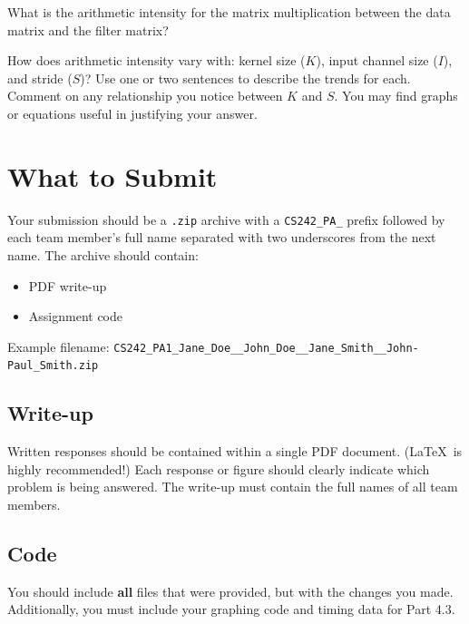 \documentclass[a4 paper]{article}
\begin{document}
\solution{}

What is the arithmetic intensity for the matrix multiplication between the data matrix and the filter matrix?

\solution{}

How does arithmetic intensity vary with: kernel size ($K$), input channel size ($I$), and stride ($S$)?
Use one or two sentences to describe the trends for each.
Comment on any relationship you notice between $K$ and $S$.
You may find graphs or equations useful in justifying your answer.
\solution{}


\section{What to Submit}
Your submission should be a \texttt{.zip} archive with a \texttt{CS242\_PA\_} prefix followed by each team member's full name separated with two underscores from the next name. The archive should contain:
\begin{itemize}
    \item PDF write-up
    \item Assignment code
\end{itemize}

\noindent
Example filename: \texttt{CS242\_PA1\_Jane\_Doe\_\_John\_Doe\_\_Jane\_Smith\_\_John-Paul\_Smith.zip}\\

\subsection*{Write-up}
Written responses should be contained within a single PDF document.
(\LaTeX~is highly recommended!)
Each response or figure should clearly indicate which problem is being answered.
The write-up must contain the full names of all team members.

\subsection*{Code}
You should include \textbf{all} files that were provided, but with the changes you made.
Additionally, you must include your graphing code and timing data for Part 4.3.
\end{document}
